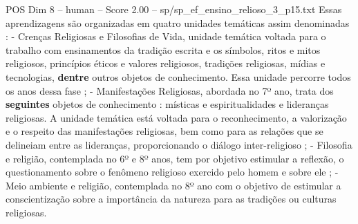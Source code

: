 \begin{textsample}{POS Dim 8 – human – Score 2.00 – sp/sp\_ef\_ensino\_relioso\_3\_p15.txt}  \label{ex:f8_pos_008}
Essas aprendizagens são organizadas em quatro unidades temáticas assim denominadas : - Crenças Religiosas e Filosofias de Vida, unidade temática voltada para o trabalho com ensinamentos da tradição escrita e os símbolos, ritos e mitos religiosos, princípios éticos e valores religiosos, tradições religiosas, mídias e tecnologias, \textbf{dentre} outros objetos de conhecimento.
Essa unidade percorre todos os anos dessa fase ; - Manifestações Religiosas, abordada no 7º ano, trata dos \textbf{seguintes} objetos de conhecimento : místicas e espiritualidades e lideranças religiosas.
A unidade temática está voltada para o reconhecimento, a valorização e o respeito das manifestações religiosas, bem como para as relações que se delineiam entre as lideranças, proporcionando o diálogo inter-religioso ; - Filosofia e religião, contemplada no 6º e 8º anos, tem por objetivo estimular a reflexão, o questionamento sobre o fenômeno religioso exercido pelo homem e sobre ele ; - Meio ambiente e religião, contemplada no 8º ano com o objetivo de estimular a conscientização sobre a importância da natureza para as tradições ou culturas religiosas.

\end{textsample}
